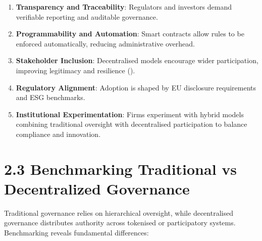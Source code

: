 \documentclass[
  english,
  12pt,
  oneside,
  open=any]{scrbook}
\providecommand{\tightlist}{%
  \setlength{\itemsep}{0pt}\setlength{\parskip}{0pt}}\usepackage{longtable,booktabs,array}
\begin{document}
\begin{enumerate}
\def\labelenumi{\arabic{enumi}.}
\tightlist
\item
  \textbf{Transparency and Traceability}: Regulators and investors
  demand verifiable reporting and auditable governance.\\
\item
  \textbf{Programmability and Automation}: Smart contracts allow rules
  to be enforced automatically, reducing administrative overhead.\\
\item
  \textbf{Stakeholder Inclusion}: Decentralised models encourage wider
  participation, improving legitimacy and resilience
  ().\\
\item
  \textbf{Regulatory Alignment}: Adoption is shaped by EU disclosure
  requirements and ESG benchmarks.\\
\item
  \textbf{Institutional Experimentation}: Firms experiment with hybrid
  models combining traditional oversight with decentralised
  participation to balance compliance and innovation.
\end{enumerate}

\section{2.3 Benchmarking Traditional vs Decentralized
Governance}\label{sec-benchmark}

Traditional governance relies on hierarchical oversight, while
decentralised governance distributes authority across tokenised or
participatory systems. Benchmarking reveals fundamental differences:
\end{document}
